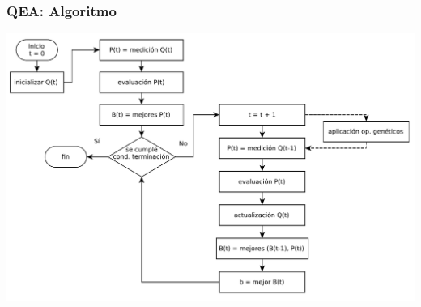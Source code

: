 \documentclass{beamer}
\begin{document}
\begin{frame}
\frametitle{QEA: Algoritmo}

\centering
\includegraphics[scale=0.55]{QEA_flowchart.pdf}

\end{frame}
\end{document}
